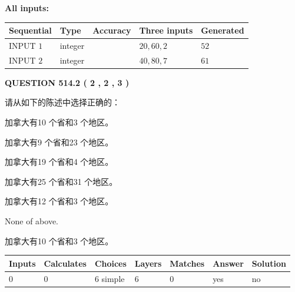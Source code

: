 \documentclass{ctexart}
\begin{document}
   
   
   
\noindent\vspace{0.1in}\hspace{-0.08in} {\textbf{\Large{All inputs: }}}
   
   
  
  
\noindent\begin{tabular}{|l|l|l|l|l|}
\hline
 Sequential & Type & Accuracy & Three inputs & Generated \\ 
\hline
 
 
  INPUT $  1 $ & integer &  & $
 20
 , 
 60
 , 
 2
 $ & $ 52 $ 
 \\  \hline  
 
 
  INPUT $  2 $ & integer &  & $
 40
 , 
 80
 , 
 7
 $ & $ 61 $ 
 \\  \hline  
 \end{tabular}
   
   
  
\vspace{0.2in}
  
{\textbf{\Large{QUESTION
514.2 
 ( 2 , 2 , 3 )
}}}
  
  
请从如下的陈述中选择正确的：
 
 
加拿大有10 个省和3 个地区。
 
 
加拿大有9 个省和23 个地区。
 
 
加拿大有19 个省和4 个地区。
 
 
加拿大有25 个省和31 个地区。
 
 
加拿大有12 个省和3 个地区。
 
 
 None of above.
 
 
\noindent{}
 
 
加拿大有10 个省和3 个地区。
 
 
\noindent{}
 
 
   
   
   
   
\noindent\begin{tabular}{|l|l|l|l|l|l|l|}
 \hline
Inputs & Calculates & Choices & Layers & Matches & Answer & Solution \\ \hline
 0  & 
 0  & 
 6
  simple  
  & 
 6  & 
 0  & 
  yes & 
  no 
  \\ \hline
 \end{tabular}
   
\end{document}
